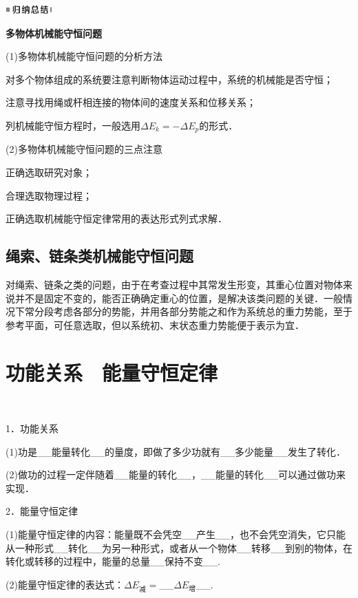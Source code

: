 \documentclass[cn,10.5pt,chinese,mac,chinesefont=founder]{elegantbook}
\begin{document}
\begin{center}\includegraphics[width=0.70764in,height=0.12292in]{media/image13.png}

\textbf{多物体机械能守恒问题}
\end{center}


(1)多物体机械能守恒问题的分析方法

对多个物体组成的系统要注意判断物体运动过程中，系统的机械能是否守恒；

注意寻找用绳或杆相连接的物体间的速度关系和位移关系；

列机械能守恒方程时，一般选用$\Delta E_k=-\Delta E_p$的形式．

(2)多物体机械能守恒问题的三点注意

正确选取研究对象；

合理选取物理过程；

正确选取机械能守恒定律常用的表达形式列式求解．


\subsection{绳索、链条类机械能守恒问题}

对绳索、链条之类的问题，由于在考查过程中其常发生形变，其重心位置对物体来说并不是固定不变的，能否正确确定重心的位置，是解决该类问题的关键．一般情况下常分段考虑各部分的势能，并用各部分势能之和作为系统总的重力势能，至于参考平面，可任意选取，但以系统初、末状态重力势能便于表示为宜．



\newpage
\section{功能关系　能量守恒定律}　


1．功能关系

(1)功是\_\_能量转化\_\_的量度，即做了多少功就有\_\_多少能量\_\_发生了转化．

(2)做功的过程一定伴随着\_\_能量的转化\_\_，\_\_能量的转化\_\_可以通过做功来实现．

2．能量守恒定律

(1)能量守恒定律的内容：能量既不会凭空\_\_产生\_\_，也不会凭空消失，它只能从一种形式\_\_转化\_\_为另一种形式，或者从一个物体\_\_转移\_\_到别的物体，在转化或转移的过程中，能量的总量\_\_保持不变\_\_.

(2)能量守恒定律的表达式：$\Delta E_{\text{减}}=$\_\_$\Delta E_{\text{增}}$\_\_.
\end{document}
